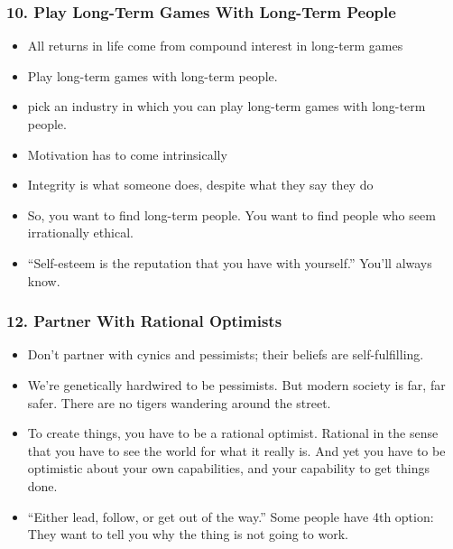 \begin{frame}[fragile]
\frametitle{10. Play Long-Term Games With Long-Term People}
\begin{itemize}
\item All returns in life come from compound interest in long-term games
\item Play long-term games with long-term people.
\item pick an industry in which you can play long-term games with long-term people.
\item Motivation has to come intrinsically
\item Integrity is what someone does, despite what they say they do
\item So, you want to find long-term people. You want to find people who seem irrationally ethical.
\item ``Self-esteem is the reputation that you have with yourself.'' You’ll always know.
\end{itemize}
\end{frame}

\begin{frame}[fragile]
\frametitle{12. Partner With Rational Optimists}
\begin{itemize}
\item Don't partner with cynics and pessimists; their beliefs are self-fulfilling.
\item We’re genetically hardwired to be pessimists. But modern society is far, far safer. There are no tigers wandering around the street.
\item To create things, you have to be a rational optimist. Rational in the sense that you have to see the world for what it really is. And yet you have to be optimistic about your own capabilities, and your capability to get things done.
\item``Either lead, follow, or get out of the way.'' Some people have 4th option: They want to tell you why the thing is not going to work.
\end{itemize}
\end{frame}



